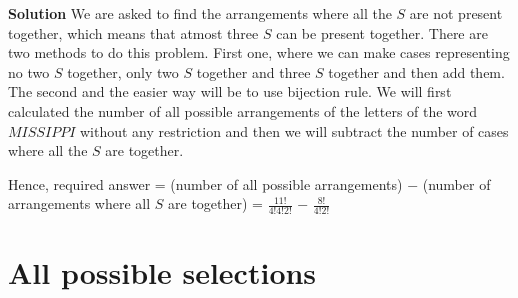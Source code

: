 \documentclass[12pt, a4paper]{article}
\begin{document}
\textbf{Solution} We are asked to find the arrangements where all the $S$ are not present together, which means that atmost three $S$ can be present together. There are two methods to do this problem. First one, where we can make cases representing no two $S$ together, only two $S$ together and three $S$ together and then add them. The second and the easier way will be to use bijection rule. We will first calculated the number of all possible arrangements of the letters of the word $MISSIPPI$ without any restriction and then we will subtract the number of cases where all the $S$ are together.
\begin{center}
 Hence, required answer = (number of all possible arrangements) $-$ (number of arrangements where all $S$ are together) \newline = $\frac{11!}{4!4!2!}$ $-$ $\frac{8!}{4!2!}$
\end{center}

\section{All possible selections}



   
  
\end{document}
